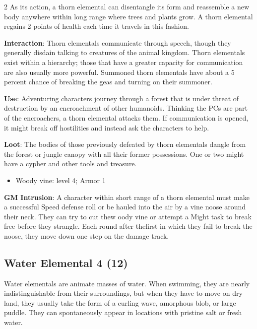 \begin{multicols}{2}
As its action, a thorn elemental can disentangle its form and reassemble a new body anywhere within long range where trees and plants grow. A thorn elemental regains 2 points of health each time it travels in this fashion. 

\textbf{Interaction}: Thorn elementals communicate through speech, though they generally disdain talking to creatures of the animal kingdom. Thorn elementals exist within a hierarchy; those that have a greater capacity for communication are also usually more powerful. Summoned thorn elementals have about a 5 percent chance of breaking the geas and turning on their summoner. 

\textbf{Use}: Adventuring characters journey through a forest that is under threat of destruction by an encroachment of other humanoids. Thinking the PCs are part of the encroachers, a thorn elemental attacks them. If communication is opened, it might break off hostilities and instead ask the characters to help. 

\textbf{Loot}: The bodies of those previously defeated by thorn elementals dangle from the forest or jungle canopy with all their former possessions. One or two might have a cypher and other tools and treasure.

\begin{itemize} 
\item Woody vine: level 4; Armor 1
\end{itemize}

\textbf{GM Intrusion}: A character within short range of a thorn elemental must make a successful Speed defense roll or be hauled into the air by a vine noose around their neck. They can try to cut thew oody vine or attempt a Might task to break free before they strangle. Each round after thefirst in which they fail to break the noose, they move down one step on the damage track.

\subsection{Water Elemental 4 (12)}

Water elementals are animate masses of water. When swimming, they are nearly indistinguishable from their surroundings, but when they have to move on dry land, they usually take the form of a curling wave, amorphous blob, or large puddle. They can spontaneously appear in locations with pristine salt or fresh water. 


\end{multicols}
